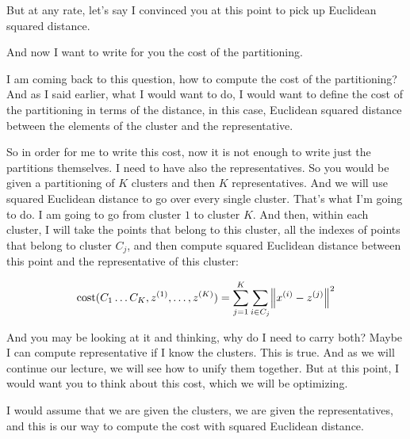 \documentclass[a4paper, 12pt]{article}
\begin{document}
But at any rate, let's say I convinced you at this point to pick up Euclidean
squared distance.

And now I want to write for you the cost of the partitioning.

I am coming back to this question, how to compute the cost of the partitioning?
And as I said earlier, what I would want to do, I would want to define the cost
of the partitioning in terms of the distance, in this case, Euclidean squared
distance between the elements of the cluster and the representative.

So in order for me to write this cost, now it is not enough to write just the
partitions themselves. I need to have also the representatives. So you would be
given a partitioning of \(K\) clusters and then \(K\) representatives. And we will use
squared Euclidean distance to go over every single cluster. That's what I'm going
to do. I am going to go from cluster \(1\) to cluster \(K\). And then, within each
cluster, I will take the points that belong to this cluster, all the indexes of
points that belong to cluster \(C_j\), and then compute squared Euclidean distance
between this point and the representative of this cluster:

\begin{equation}
\text{cost}(C_1 \ldots C_K, z^{(1)}, \ldots ,z^{(K)}) = \sum_{j=1}^{K} \sum_{i \in C_j} \norm{x^{(i)} - z^{(j)}}^2
\end{equation}

And you may be looking at it and thinking, why do I need to carry both? Maybe I
can compute representative if I know the clusters. This is true. And as we will
continue our lecture, we will see how to unify them together. But at this point,
I would want you to think about this cost, which we will be optimizing.

I would assume that we are given the clusters, we are given the representatives,
and this is our way to compute the cost with squared Euclidean distance.
\end{document}

